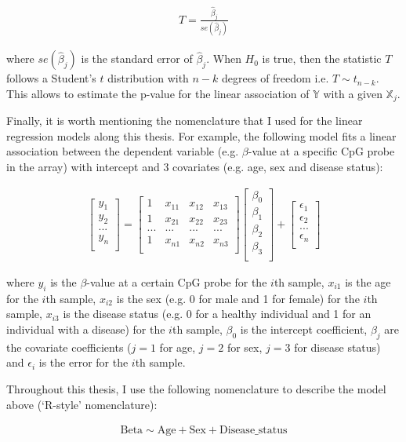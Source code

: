 \begin{align}
T=\frac{\hat{\beta}_j}{se(\hat{\beta}_j)} 
\end{align}

where $se(\hat{\beta}_j)$ is the standard error of $\hat{\beta}_j$. When $H_0$ is true, then the statistic $T$ follows a Student's $t$ distribution with $n-k$ degrees of freedom i.e. $T\sim t_{n-k}$. This allows to estimate the p-value for the linear association of $\mathbb Y$ with a given $\mathbb X_j$.

\bigskip

Finally, it is worth mentioning the nomenclature that I used for the linear regression models along this thesis. For example, the following model fits a linear association between the dependent variable (e.g. $\beta$-value at a specific CpG probe in the array) with intercept and 3 covariates (e.g. age, sex and disease status):

\begin{align}
\begin{bmatrix}
y_{1} \\
y_{2} \\
... \\
y_{n} \\
\end{bmatrix}
=
\begin{bmatrix}
1 & x_{11}  & x_{12} & x_{13} \\
1 & x_{21} & x_{22} & x_{23} \\
... & ... & ... & ... \\
1& x_{n1} & x_{n2} & x_{n3}  \\
\end{bmatrix}
%
\begin{bmatrix}
\beta_{0} \\
\beta_{1} \\
\beta_{2} \\
\beta_{3} \\
\end{bmatrix}
+
\begin{bmatrix}
\epsilon_{1} \\
\epsilon_{2} \\
... \\
\epsilon_{n} \\
\end{bmatrix}
\end{align}

where $y_i$ is the $\beta$-value at a certain CpG probe for the $i$th sample, $x_{i1}$ is the age for the $i$th sample, $x_{i2}$ is the sex (e.g. 0 for male and 1 for female) for the $i$th sample, $x_{i3}$ is the disease status (e.g. 0 for a healthy individual and 1 for an individual with a disease) for the $i$th sample, $\beta_0$ is the intercept coefficient, $\beta_j$ are the covariate coefficients ($j=1$ for age, $j=2$ for sex, $j=3$ for disease status) and $\epsilon_i$ is the error for the $i$th sample. 

\bigskip

Throughout this thesis, I use the following nomenclature to describe the model above (`R-style' nomenclature):

\begin{align}
\text{Beta} \sim \text{Age}+\text{Sex}+\text{Disease\_status}
\end{align}



